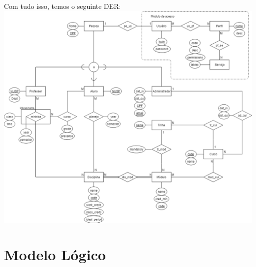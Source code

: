 \documentclass{article}
\begin{document}
   		\quad Com tudo isso, temos o seguinte DER: \\
    \includegraphics[width=\textwidth]{DER-Completo.png}
    
    \section{Modelo Lógico}
\end{document}
